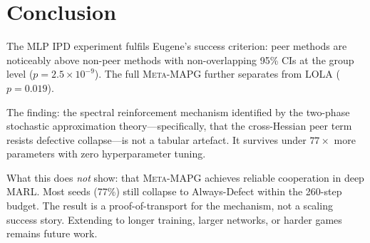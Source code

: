 \documentclass[11pt,a4paper]{article}
\newcommand{\MAPG}{\textsc{Meta-MAPG}}
\begin{document}
\section{Conclusion}

The MLP IPD experiment fulfils Eugene's success criterion: peer methods are noticeably above non-peer methods with non-overlapping 95\% CIs at the group level ($p = 2.5 \times 10^{-9}$). The full \MAPG{} further separates from LOLA ($p = 0.019$).

The finding: the spectral reinforcement mechanism identified by the two-phase stochastic approximation theory---specifically, that the cross-Hessian peer term resists defective collapse---is not a tabular artefact. It survives under $77\times$ more parameters with zero hyperparameter tuning.

What this does \emph{not} show: that \MAPG{} achieves reliable cooperation in deep MARL. Most seeds (77\%) still collapse to Always-Defect within the 260-step budget. The result is a proof-of-transport for the mechanism, not a scaling success story. Extending to longer training, larger networks, or harder games remains future work.


\end{document}
